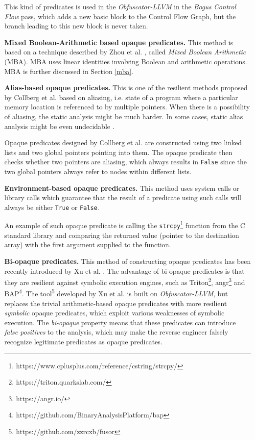 \documentclass[
  digital, %
  table,   %
  twoside, %
  nolof,     %
  nolot,     %
]{fithesis3}
\theoremstyle{definition}
\begin{document}
This kind of predicates is used in the \textit{Obfuscator-LLVM} in the \textit{Bogus Control Flow} pass, which adds a new basic block to the Control Flow Graph, but the branch leading to this new block is never taken. 

\textbf{Mixed Boolean-Arithmetic based opaque predicates.} This method is based on a technique described by Zhou et al. \cite{mba_zhou}, called \textit{Mixed Boolean Arithmetic} (MBA). 
MBA uses linear identities involving Boolean and arithmetic operations. MBA is further discussed in Section \ref{mba}.

\textbf{Alias-based opaque predicates.} This is one of the resilient methods proposed by Collberg et al. \cite{manufacturing_opaque} based on aliasing, i.e. state of a program where a particular memory location is referenced to by multiple pointers. When there is a possibility of aliasing, the static analysis might be much harder. In some cases, static alias analysis might be even undecidable \cite{aliasing_hard}.

Opaque predicates designed by Collberg et al. are constructed using two linked lists and two global pointers pointing into them. The opaque predicate then checks whether two pointers are aliasing, which always results in \texttt{False} since the two global pointers always refer to nodes within different lists. 

\textbf{Environment-based opaque predicates.}
This method uses system calls or library calls which guarantee that the result of a predicate using such calls will always be either \texttt{True} or \texttt{False}. 

An example of such opaque predicate is calling the \texttt{strcpy}\footnote{https://www.cplusplus.com/reference/cstring/strcpy/} function from the C standard library and comparing the returned value (pointer to the destination array) with the first argument supplied to the function.

\textbf{Bi-opaque predicates.} This method of constructing opaque predicates has been recently introduced by Xu et al. \cite{bi_opaque}. The advantage of bi-opaque predicates is that they are resilient against symbolic execution engines, such as Triton\footnote{https://triton.quarkslab.com/}, angr\footnote{https://angr.io/} and BAP\footnote{https://github.com/BinaryAnalysisPlatform/bap}. The tool\footnote{https://github.com/zzrcxb/fusor} developed by Xu et al. is built on \textit{Obfuscator-LLVM}, but replaces the trivial arithmetic-based opaque predicates with more resilient \textit{symbolic} opaque predicates, which exploit various weaknesses of symbolic execution. The \textit{bi-opaque} property means that these predicates can introduce \textit{false positives} to the analysis, which may make the reverse engineer falsely recognize legitimate predicates as opaque predicates.
\end{document}
